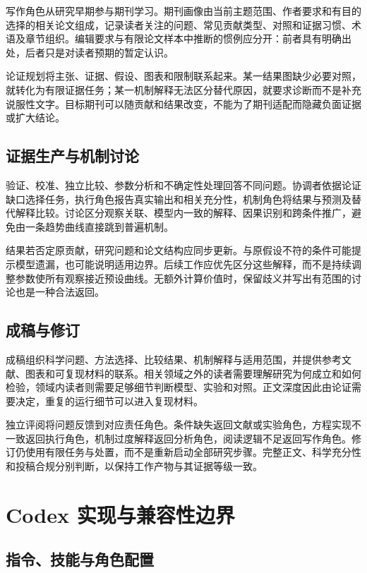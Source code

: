 \documentclass[UTF8,fontset=fandol,a4paper,11pt]{ctexart}
\begin{document}
写作角色从研究早期参与期刊学习。期刊画像由当前主题范围、作者要求和有目的选择的相关论文组成，记录读者关注的问题、常见贡献类型、对照和证据习惯、术语及章节组织。编辑要求与有限论文样本中推断的惯例应分开：前者具有明确出处，后者只是对读者预期的暂定认识。

论证规划将主张、证据、假设、图表和限制联系起来。某一结果图缺少必要对照，就转化为有限证据任务；某一机制解释无法区分替代原因，就要求诊断而不是补充说服性文字。目标期刊可以随贡献和结果改变，不能为了期刊适配而隐藏负面证据或扩大结论。

\subsection{证据生产与机制讨论}

验证、校准、独立比较、参数分析和不确定性处理回答不同问题。协调者依据论证缺口选择任务，执行角色报告真实输出和相关充分性，机制角色将结果与预测及替代解释比较。讨论区分观察关联、模型内一致的解释、因果识别和跨条件推广，避免由一条趋势曲线直接跳到普遍机制。

结果若否定原贡献，研究问题和论文结构应同步更新。与原假设不符的条件可能提示模型遗漏，也可能说明适用边界。后续工作应优先区分这些解释，而不是持续调整参数使所有观察接近预设曲线。无额外计算价值时，保留歧义并写出有范围的讨论也是一种合法返回。

\subsection{成稿与修订}

成稿组织科学问题、方法选择、比较结果、机制解释与适用范围，并提供参考文献、图表和可复现材料的联系。相关领域之外的读者需要理解研究为何成立和如何检验，领域内读者则需要足够细节判断模型、实验和对照。正文深度因此由论证需要决定，重复的运行细节可以进入复现材料。

独立评阅将问题反馈到对应责任角色。条件缺失返回文献或实验角色，方程实现不一致返回执行角色，机制过度解释返回分析角色，阅读逻辑不足返回写作角色。修订仍使用有限任务与处置，而不是重新启动全部研究步骤。完整正文、科学充分性和投稿合规分别判断，以保持工作产物与其证据等级一致。

\section{Codex 实现与兼容性边界}

\subsection{指令、技能与角色配置}
\end{document}
